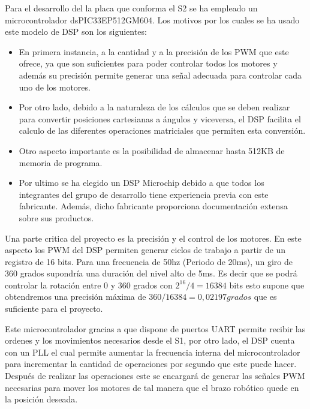 Para el desarrollo del la placa que conforma el S2 se ha empleado un microcontrolador dsPIC33EP512GM604.
Los motivos por los cuales se ha usado este modelo de DSP son los siguientes: 

\begin{itemize}
\item En primera instancia, a la cantidad y a la precisión de los PWM que este ofrece, ya que son suficientes para poder controlar todos los motores y además su precisión permite generar una señal adecuada para controlar cada uno de los motores.

\item Por otro lado, debido a la naturaleza de los cálculos que se deben realizar para convertir posiciones cartesianas a ángulos y viceversa, el DSP facilita el calculo de las diferentes operaciones matriciales que permiten esta conversión.

\item Otro aspecto importante es la posibilidad de almacenar hasta 512KB de memoria de programa.

\item Por ultimo se ha elegido un DSP Microchip debido a que todos los integrantes del grupo de desarrollo tiene experiencia previa con este fabricante. Además, dicho fabricante proporciona documentación extensa sobre sus productos.

\end{itemize}

Una parte critica del proyecto es la precisión y el control de los motores. En este aspecto los PWM del DSP permiten generar ciclos de trabajo a partir de un registro de 16 bits. Para una frecuencia de 50hz (Periodo de 20ms), un giro de 360 grados supondría una duración del nivel alto de 5ms. Es decir que se podrá controlar la rotación entre 0 y 360 grados con $ 2^{16}/4 = 16384$ bits esto supone que obtendremos una precisión máxima de $360/16384 = 0,02197 grados$ que es suficiente para el proyecto.

Este microcontrolador gracias a que dispone de puertos UART permite recibir las ordenes y los movimientos necesarios desde el S1, por otro lado, el DSP cuenta con un PLL el cual permite aumentar la frecuencia interna del microcontrolador para incrementar la cantidad de operaciones por segundo que este puede hacer. Después de realizar las operaciones este se encargará de generar las señales PWM necesarias para mover los motores de tal manera que el brazo robótico quede en la posición deseada.





    
